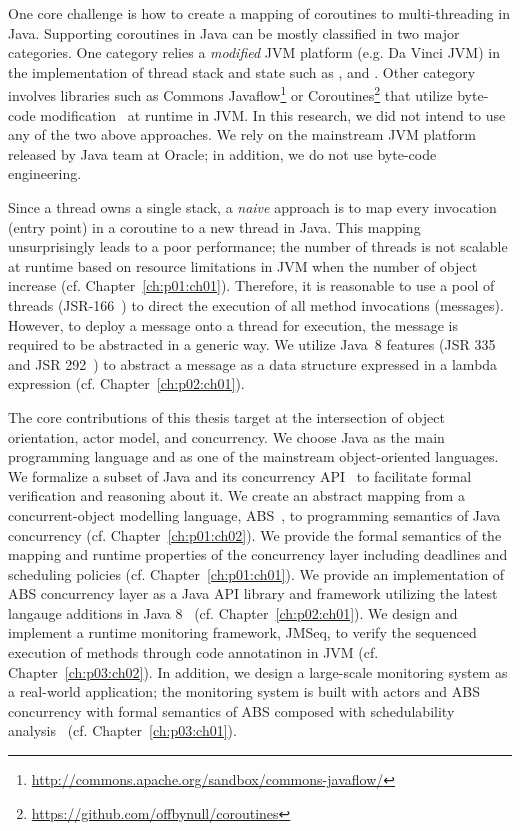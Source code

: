 One core challenge is how to create a mapping of coroutines to multi-threading in Java.
Supporting coroutines in Java can be mostly classified in two major categories.
One category relies a \emph{modified} JVM platform (e.g. Da Vinci JVM) in the implementation of thread stack and state such as \cite{Stadler:2009:LCJ:1596655.1596679}, \cite{Stadler:2010:ECJ:1852761.1852765} and \cite{Liu:2006:II:1111320.1111063}.
Other category involves libraries such as Commons Javaflow\footnote{\url{http://commons.apache.org/sandbox/commons-javaflow/}} or Coroutines\footnote{\url{https://github.com/offbynull/coroutines}} that utilize byte-code modification~\cite{dahm1999byte} at runtime in JVM.
In this research, we did not intend to use any of the two above approaches.
We rely on the mainstream JVM platform released by Java team at Oracle; in addition, we do not use byte-code engineering.

Since a thread owns a single stack, a \emph{naive} approach is to map every invocation (entry point) in a coroutine to a new thread in Java. 
This mapping unsurprisingly leads to a poor performance;
the number of threads is not scalable at runtime based on resource limitations in JVM when the number of object increase (cf. Chapter~\ref{ch:p01:ch01}).
Therefore, it is reasonable to use a pool of threads (JSR-166~\cite{jsr166}) to direct the execution of all method invocations (messages). 
However, to deploy a message onto a thread for execution, the message is required to be abstracted in a generic way.
We utilize Java~8 features (JSR 335~\cite{jsr335} and JSR 292~\cite{jsr292:invokedyn}) to abstract a message as a data structure expressed in a lambda expression (cf. Chapter~\ref{ch:p02:ch01}).

The core contributions of this thesis target at the intersection of object 
orientation, actor model, and concurrency.
We choose Java as the main programming language and as one of the mainstream 
object-oriented languages. 
We formalize a subset of Java and its concurrency API~\cite{jsr166} to 
facilitate formal verification and reasoning about it.
We create an abstract mapping from a concurrent-object modelling language, 
ABS~\cite{johnsen2012abs}, to programming semantics of Java concurrency (cf. Chapter~\ref{ch:p01:ch02}). 
We provide the formal semantics of the mapping and runtime properties of 
the concurrency layer including deadlines and scheduling policies (cf. Chapter~\ref{ch:p01:ch01}).
We provide an implementation of ABS concurrency layer as a Java API library 
and framework utilizing the latest langauge additions 
in Java 8~\cite{jsr335:lambda:translation} (cf. Chapter~\ref{ch:p02:ch01}).
We design and implement a runtime monitoring framework, JMSeq, to verify the
sequenced execution of methods through code annotatinon in JVM (cf. Chapter~\ref{ch:p03:ch02}). 
In addition, we design a large-scale monitoring system as a real-world 
application; the monitoring system is built with actors and ABS concurrency 
with formal semantics of ABS composed with schedulability 
analysis~\cite{fersman2007task} (cf. Chapter~\ref{ch:p03:ch01}).

